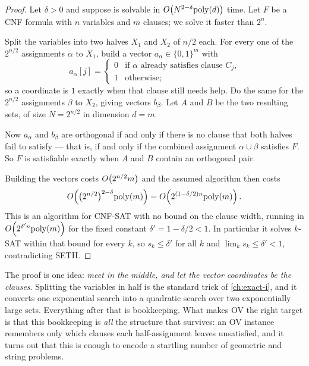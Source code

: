 \begin{proof}
Let $\delta > 0$ and suppose  is solvable in
$O\!\left(N^{2-\delta}\mathrm{poly}(d)\right)$ time. Let $F$ be a CNF formula with $n$
variables and $m$ clauses; we solve it faster than $2^n$.

Split the variables into two halves $X_1$ and $X_2$ of $n/2$ each. For every
one of the $2^{n/2}$ assignments $\alpha$ to $X_1$, build a vector
$a_\alpha \in \{0,1\}^m$ with
\[ a_\alpha[j] = \begin{cases}
     0 & \text{if $\alpha$ already satisfies clause $C_j$,} \\
     1 & \text{otherwise;}
   \end{cases} \]
so a coordinate is $1$ exactly when that clause still needs help. Do the same
for the $2^{n/2}$ assignments $\beta$ to $X_2$, giving vectors $b_\beta$. Let
$A$ and $B$ be the two resulting sets, of size $N = 2^{n/2}$ in dimension
$d = m$.

Now $a_\alpha$ and $b_\beta$ are orthogonal if and only if there is no clause
that both halves fail to satisfy --- that is, if and only if the combined
assignment $\alpha \cup \beta$ satisfies $F$. So $F$ is satisfiable exactly
when $A$ and $B$ contain an orthogonal pair.

Building the vectors costs $O\!\left(2^{n/2}m\right)$ and the assumed algorithm then
costs
\[ O\!\left(\bigl(2^{n/2}\bigr)^{2-\delta}\mathrm{poly}(m)\right)
   = O\!\left(2^{(1-\delta/2)n}\mathrm{poly}(m)\right). \]
This is an algorithm for CNF-SAT with no bound on the clause width, running in
$O\!\left(2^{\delta' n}\mathrm{poly}(m)\right)$ for the fixed constant
$\delta' = 1-\delta/2 < 1$. In particular it solves $k$-SAT within that bound
for every $k$, so $s_k \le \delta'$ for all $k$ and
$\lim_k s_k \le \delta' < 1$, contradicting SETH.
\end{proof}

\begin{intuition}
The proof is one idea: \emph{meet in the middle, and let the vector coordinates
be the clauses}. Splitting the variables in half is the standard trick of
\cref{ch:exact-i}, and it converts one exponential search into a quadratic
search over two exponentially large sets. Everything after that is
bookkeeping. What makes OV the right target is that this bookkeeping is
\emph{all} the structure that survives: an OV instance remembers only which
clauses each half-assignment leaves unsatisfied, and it turns out that this is
enough to encode a startling number of geometric and string problems.
\end{intuition}

